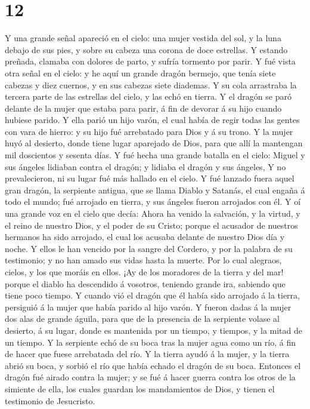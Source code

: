 \hypertarget{section-11}{%
\section{12}\label{section-11}}

 Y una grande señal apareció en el cielo: una mujer
vestida del sol, y la luna debajo de sus pies, y sobre su cabeza una
corona de doce estrellas.  Y estando preñada, clamaba con
dolores de parto, y sufría tormento por parir.  Y fué
vista otra señal en el cielo: y he aquí un grande dragón bermejo, que
tenía siete cabezas y diez cuernos, y en sus cabezas siete diademas.
 Y su cola arrastraba la tercera parte de las estrellas
del cielo, y las echó en tierra. Y el dragón se paró delante de la mujer
que estaba para parir, á fin de devorar á su hijo cuando hubiese parido.
 Y ella parió un hijo varón, el cual había de regir todas
las gentes con vara de hierro: y su hijo fué arrebatado para Dios y á su
trono.  Y la mujer huyó al desierto, donde tiene lugar
aparejado de Dios, para que allí la mantengan mil doscientos y sesenta
días.  Y fué hecha una grande batalla en el cielo: Miguel
y sus ángeles lidiaban contra el dragón; y lidiaba el dragón y sus
ángeles,  Y no prevalecieron, ni su lugar fué más hallado
en el cielo.  Y fué lanzado fuera aquel gran dragón, la
serpiente antigua, que se llama Diablo y Satanás, el cual engaña á todo
el mundo; fué arrojado en tierra, y sus ángeles fueron arrojados con él.
 Y oí una grande voz en el cielo que decía: Ahora ha
venido la salvación, y la virtud, y el reino de nuestro Dios, y el poder
de su Cristo; porque el acusador de nuestros hermanos ha sido arrojado,
el cual los acusaba delante de nuestro Dios día y noche. 
Y ellos le han vencido por la sangre del Cordero, y por la palabra de su
testimonio; y no han amado sus vidas hasta la muerte. 
Por lo cual alegraos, cielos, y los que moráis en ellos. ¡Ay de los
moradores de la tierra y del mar! porque el diablo ha descendido á
vosotros, teniendo grande ira, sabiendo que tiene poco tiempo.
 Y cuando vió el dragón que él había sido arrojado á la
tierra, persiguió á la mujer que había parido al hijo varón.
 Y fueron dadas á la mujer dos alas de grande águila,
para que de la presencia de la serpiente volase al desierto, á su lugar,
donde es mantenida por un tiempo, y tiempos, y la mitad de un tiempo.
 Y la serpiente echó de su boca tras la mujer agua como
un río, á fin de hacer que fuese arrebatada del río.  Y
la tierra ayudó á la mujer, y la tierra abrió su boca, y sorbió el río
que había echado el dragón de su boca.  Entonces el
dragón fué airado contra la mujer; y se fué á hacer guerra contra los
otros de la simiente de ella, los cuales guardan los mandamientos de
Dios, y tienen el testimonio de Jesucristo.

